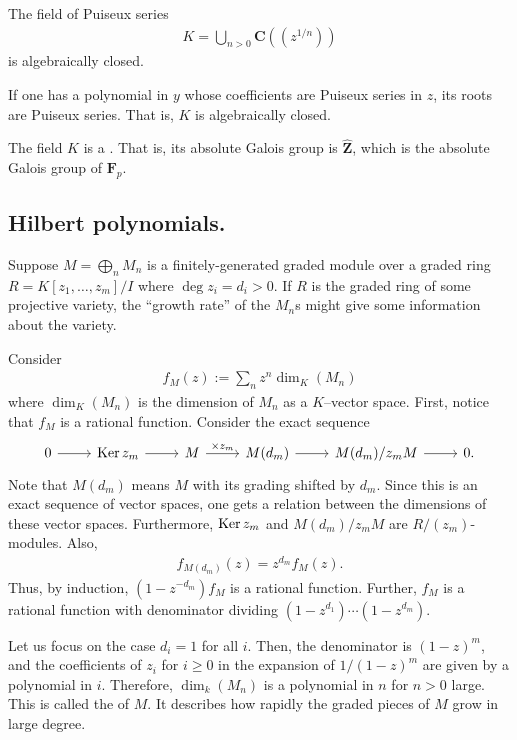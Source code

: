 \documentclass [11 pt, oneside] {article}
\begin{document}
\begin{corollary}[ ]\label{}\text{}
The field of Puiseux series
\begin{align*}
	K = \bigcup_{n>0} \mathbf{C} (\!(z^{1/n})\!)
\end{align*}
is algebraically closed.
\end{corollary}

If one has a polynomial in $y$ whose coefficients are Puiseux series in $z$, its roots are Puiseux series. That is, $K$ is algebraically closed.

The field $K$ is a . That is, its absolute Galois group is $\widehat{\mathbf{Z}}$, which is the absolute Galois group of $\mathbf{F}_{p}$.

\subsection{Hilbert polynomials.}
Suppose $M=\bigoplus_{n}M_n$ is a finitely-generated graded module over a graded ring $R = K[z_1,\hdots, z_m]/I$ where $\deg z_i = d_i >0$. If $R$ is the graded ring of some projective variety, the ``growth rate'' of the $M_n$s might give some information about the variety.

Consider
\begin{align*}
	f_M(z) :=  \sum_{n}^{} z^n\dim_K(M_n)
\end{align*}
where $\dim_K(M_n)$ is the dimension of $M_n$ as a $K$--vector space. First, notice that $f_M$ is a rational function. Consider the exact sequence
\[
\begin{tikzcd}
	0\ar[r]&\Ker z_m \ar[r] & M \ar[r,"\times z_m"]& M(d_m) \ar[r] & M(d_m)/z_m M \ar[r]& 0. 
\end{tikzcd}
\]
Note that $M(d_m)$ means $M$ with its grading shifted by $d_m$. Since this is an exact sequence of vector spaces, one gets a relation between the dimensions of these vector spaces. Furthermore, $\operatorname{Ker} z_m$ and $M(d_m)/z_m M$ are $R/(z_m)$-modules. Also,
\begin{align*}
	f_{M(d_m)}(z) = z^{d_m} f_M(z).
\end{align*}
Thus, by induction, $(1-z^{-d_m})f_M$ is a rational function. Further, $f_M$ is a rational function with denominator dividing $(1-z^{d_1})\cdots(1-z^{d_m})$.

Let us focus on the case $d_i=1$ for all $i$. Then, the denominator is $(1-z)^m$, and the coefficients of $z_i$ for $i\ge 0$ in the expansion of $1/(1-z)^m$ are given by a polynomial in $i$. Therefore, $\dim_k (M_n)$ is a polynomial in $n$ for $n>0$ large. This is called the  of $M$. It describes how rapidly the graded pieces of $M$ grow in large degree.
\end{document}
